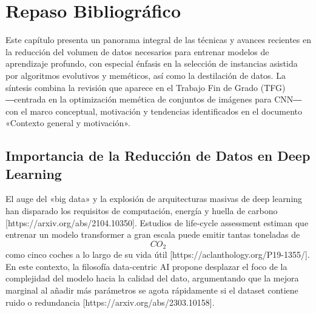 
\chapter{Repaso Bibliográfico}\label{ch:repaso-bibliografico}
Este capítulo presenta un panorama integral de las técnicas y avances recientes en la reducción del volumen de datos necesarios para entrenar modelos de aprendizaje profundo, con especial énfasis en la selección de instancias asistida por algoritmos evolutivos y meméticos, así como la destilación de datos.
La síntesis combina la revisión que aparece en el Trabajo Fin de Grado (TFG) ―centrada en la optimización memética de conjuntos de imágenes para CNN― con el marco conceptual, motivación y tendencias identificados en el documento «Contexto general y motivación».


\section{Importancia de la Reducción de Datos en Deep Learning}
El auge del «big data» y la explosión de arquitecturas masivas de deep learning han disparado los requisitos de computación, energía y huella de carbono [https://arxiv.org/abs/2104.10350].
Estudios de life-cycle assessment estiman que entrenar un modelo transformer a gran escala puede emitir tantas toneladas de $$CO_2$$ como cinco coches a lo largo de su vida útil [https://aclanthology.org/P19-1355/].
En este contexto, la filosofía data-centric AI propone desplazar el foco de la complejidad del modelo hacia la calidad del dato, argumentando que la mejora marginal al añadir más parámetros se agota rápidamente si el dataset contiene ruido o redundancia [https://arxiv.org/abs/2303.10158].

